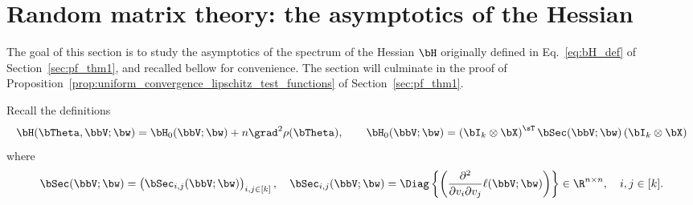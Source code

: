 \newpage
\section{Random matrix theory: the asymptotics of the Hessian}
\label{sec:RMT}
The goal of this section is to study the asymptotics of the spectrum of the Hessian $\bH$
originally defined in Eq.~\eqref{eq:bH_def} of Section~\ref{sec:pf_thm1}, and recalled bellow for convenience.
The section will culminate in the proof of Proposition~\ref{prop:uniform_convergence_lipschitz_test_functions} of Section~\ref{sec:pf_thm1}.

Recall the definitions
\begin{equation*}
\bH(\bTheta,\bbV;\bw) = \bH_0(\bbV; \bw) + n \grad^2 \rho(\bTheta), \quad\quad
    \bH_0(\bbV;\bw) = \left(\bI_k \otimes \bX\right)^\sT \bSec(\bbV;\bw)\left(\bI_k \otimes \bX\right)
\end{equation*}
where
\begin{equation*}
   \bSec(\bbV;\bw) = \begin{pmatrix}
\bSec_{i,j}(\bbV;\bw)
   \end{pmatrix}_{i,j \in[k]}
,\quad
    \bSec_{i,j}(\bbV;\bw)= \Diag\left\{\left(\frac{\partial^2}{\partial {v_i}\partial v_j}\ell(\bbV;\bw)\right)\right\}\in\R^{n\times n}, \quad i,j\in[k].
\end{equation*}
%
